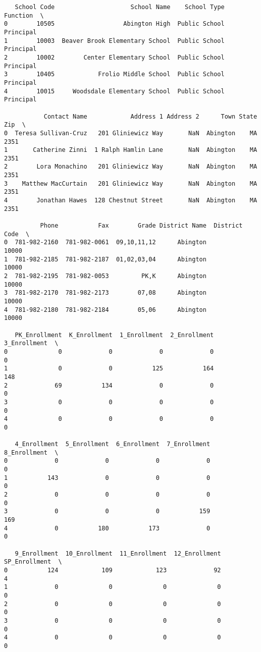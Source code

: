 \documentclass[11pt]{article}
\begin{document}
    
    \begin{verbatim}
   School Code                     School Name    School Type   Function  \
0        10505                   Abington High  Public School  Principal   
1        10003  Beaver Brook Elementary School  Public School  Principal   
2        10002        Center Elementary School  Public School  Principal   
3        10405            Frolio Middle School  Public School  Principal   
4        10015     Woodsdale Elementary School  Public School  Principal   

           Contact Name            Address 1 Address 2      Town State   Zip  \
0  Teresa Sullivan-Cruz   201 Gliniewicz Way       NaN  Abington    MA  2351   
1       Catherine Zinni  1 Ralph Hamlin Lane       NaN  Abington    MA  2351   
2        Lora Monachino   201 Gliniewicz Way       NaN  Abington    MA  2351   
3    Matthew MacCurtain   201 Gliniewicz Way       NaN  Abington    MA  2351   
4        Jonathan Hawes  128 Chestnut Street       NaN  Abington    MA  2351   

          Phone           Fax        Grade District Name  District Code  \
0  781-982-2160  781-982-0061  09,10,11,12      Abington          10000   
1  781-982-2185  781-982-2187  01,02,03,04      Abington          10000   
2  781-982-2195  781-982-0053         PK,K      Abington          10000   
3  781-982-2170  781-982-2173        07,08      Abington          10000   
4  781-982-2180  781-982-2184        05,06      Abington          10000   

   PK_Enrollment  K_Enrollment  1_Enrollment  2_Enrollment  3_Enrollment  \
0              0             0             0             0             0   
1              0             0           125           164           148   
2             69           134             0             0             0   
3              0             0             0             0             0   
4              0             0             0             0             0   

   4_Enrollment  5_Enrollment  6_Enrollment  7_Enrollment  8_Enrollment  \
0             0             0             0             0             0   
1           143             0             0             0             0   
2             0             0             0             0             0   
3             0             0             0           159           169   
4             0           180           173             0             0   

   9_Enrollment  10_Enrollment  11_Enrollment  12_Enrollment  SP_Enrollment  \
0           124            109            123             92              4   
1             0              0              0              0              0   
2             0              0              0              0              0   
3             0              0              0              0              0   
4             0              0              0              0              0   


\end{verbatim}
\end{document}
